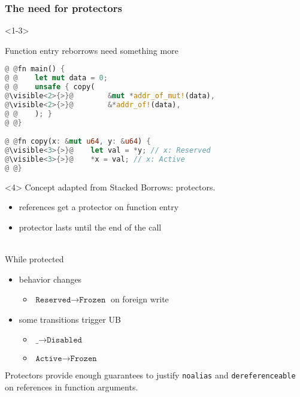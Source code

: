 \begin{frame}[fragile]
    \frametitle{The need for protectors}
    \begin{onlyenv}<1-3>
        \begin{block}{Function entry reborrows need something more}
            \begin{lstlisting}[language=rust, escapechar=@]
@ @fn main() {
@ @    let mut data = 0;
@ @    unsafe { copy(
@\visible<2>{>}@        &mut *addr_of_mut!(data),
@\visible<2>{>}@        &*addr_of!(data),
@ @    ); }
@ @}

@ @fn copy(x: &mut u64, y: &u64) {
@\visible<3>{>}@    let val = *y; // x: Reserved
@\visible<3>{>}@    *x = val; // x: Active
@ @}

            \end{lstlisting}
        \end{block}
    \end{onlyenv}

    \begin{onlyenv}<4>
        Concept adapted from Stacked Borrows: protectors.
        \begin{itemize}
            \item references get a protector on function entry
            \item protector lasts until the end of the call
        \end{itemize}
        ~\\
        While protected
        \begin{itemize}
            \item behavior changes
                \begin{itemize}
                    \item \(\texttt{Reserved} \to \texttt{Frozen}\) on foreign write
                \end{itemize}
            \item some transitions trigger UB
                \begin{itemize}
                    \item \(\texttt{\_} \to \texttt{Disabled}\)
                    \item \(\texttt{Active} \to \texttt{Frozen}\)
                \end{itemize}
        \end{itemize}

        \begin{block}{}
            Protectors provide enough guarantees to justify \texttt{noalias} and
            \texttt{dereferenceable} on references in function arguments.
        \end{block}
    \end{onlyenv}
\end{frame}

